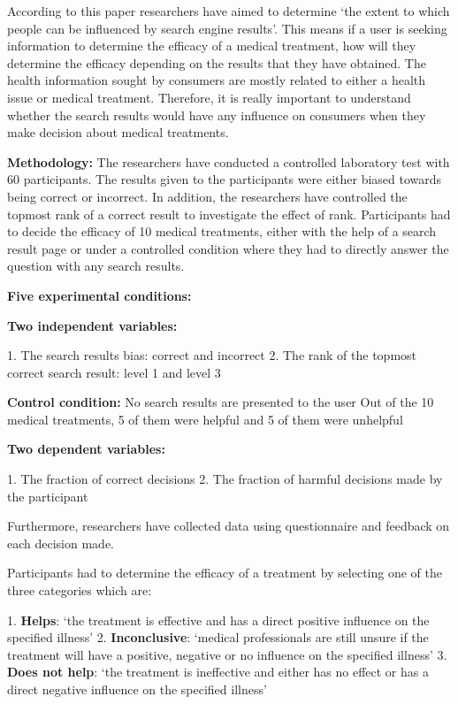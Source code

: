 \documentclass[]{article}
\begin{document}
According to this paper researchers have aimed to determine ‘the extent to which people can be influenced by search engine results’. This means if a user is seeking information to determine the efficacy of a medical treatment, how will they determine the efficacy depending on the results that they have obtained. The health information sought by consumers are mostly related to either a health issue or medical treatment. Therefore, it is really important to understand whether the search results would have any influence on consumers when they make decision about medical treatments. 
     
\textbf{Methodology:} The researchers have conducted a controlled laboratory test with 60 participants. The results given to the participants were either biased towards being correct or incorrect. In addition, the researchers have controlled the topmost rank of a correct result to investigate the effect of rank. Participants had to decide the efficacy of 10 medical treatments, either with the help of a search result page or under a controlled condition where they had to directly answer the question with any search results. 

\textbf{Five experimental conditions:}

\textbf{Two independent variables:}

1.	The search results bias: correct and incorrect
2.	The rank of the topmost correct search result: level 1 and level 3

\textbf{Control condition: }No search results are presented to the user
Out of the 10 medical treatments, 5 of them were helpful and 5 of them were unhelpful

\textbf{Two dependent variables:}

1.	The fraction of correct decisions
2.	The fraction of harmful decisions made by the participant

Furthermore, researchers have collected data using questionnaire and feedback on each decision made. 

Participants had to determine the efficacy of a treatment by selecting one of the three categories which are:

1.\textbf{	Helps}: ‘the treatment is effective and has a direct positive influence on the specified illness’
2.	\textbf{Inconclusive}: ‘medical professionals are still unsure if the treatment will have a positive, negative or no influence on the specified illness’
3.	\textbf{Does not help}: ‘the treatment is ineffective and either has no effect or has a direct negative influence on the specified illness’
\end{document}
